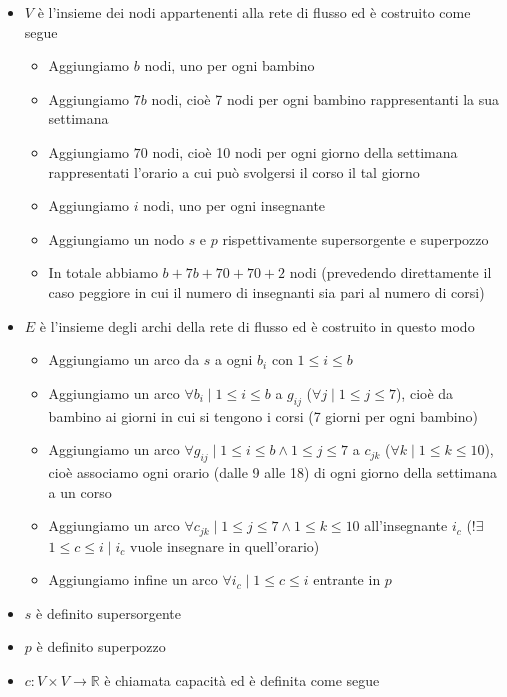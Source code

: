 \documentclass[../cheatSheetAlgoritmi.tex]{subfiles}
\begin{document}
\begin{itemize}
	\item $V$ è l'insieme dei nodi appartenenti alla rete di flusso ed è costruito come segue 
	\begin{itemize}
		\item Aggiungiamo $b$ nodi, uno per ogni bambino
		\item Aggiungiamo $7b$ nodi, cioè 7 nodi per ogni bambino rappresentanti la sua settimana
		\item Aggiungiamo $70$ nodi, cioè 10 nodi per ogni giorno della settimana rappresentati l'orario a cui può svolgersi il corso il tal giorno
		\item Aggiungiamo $i$ nodi, uno per ogni insegnante
		\item Aggiungiamo un nodo $s$ e $p$ rispettivamente supersorgente e superpozzo
		\item In totale abbiamo $b + 7b + 70 + 70 + 2$ nodi (prevedendo direttamente il caso peggiore in cui il numero di insegnanti sia pari al numero di corsi)
	\end{itemize}
	\item $E$ è l'insieme degli archi della rete di flusso ed è costruito in questo modo
	\begin{itemize}
		\item Aggiungiamo un arco da $s$ a ogni $b_{i}$ con $1 \leq i \leq b$
		\item Aggiungiamo un arco $\forall b_{i} \mid 1 \leq i \leq b$ a $g_{ij}$ ($ \forall j \mid 1\leq j \leq 7$), cioè da bambino ai giorni in cui si tengono i corsi (7 giorni per ogni bambino)
		\item Aggiungiamo un arco $\forall  g_{ij} \mid 1 \leq i \leq b \land 1 \leq j \leq 7$ a $c_{jk}$ ($\forall k \mid 1 \leq k \leq 10$), cioè associamo ogni orario (dalle 9 alle 18) di ogni giorno della settimana a un corso
		\item Aggiungiamo un arco $\forall  c_{jk} \mid 1 \leq j \leq 7 \land 1 \leq k \leq 10$ all'insegnante $i_{c}$ (!$\exists$ $1 \leq c \leq i \mid i_{c}$ vuole insegnare in quell'orario)
		\item Aggiungiamo infine un arco $\forall i_{c} \mid 1 \leq c \leq i$ entrante in $p$
	\end{itemize}
	\item $s$ è definito supersorgente
	\item $p$ è definito superpozzo
	\item $c: V \times V \rightarrow \mathbb{R}$ è chiamata capacità ed è definita come segue
	\begin{itemize}

\end{itemize}
\end{itemize}
\end{document}
